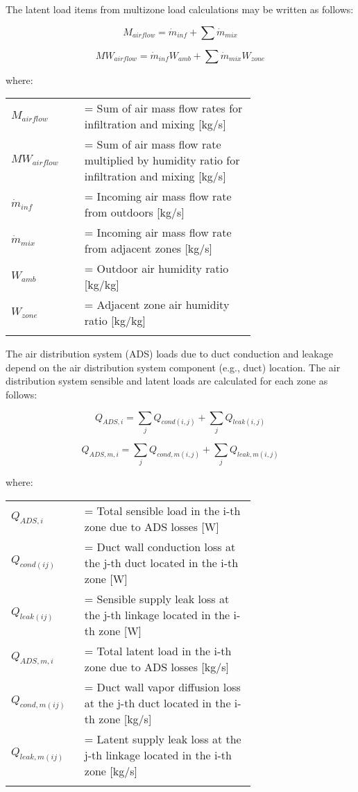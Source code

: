 The latent load items from multizone load calculations may be written as follows:

\begin{equation}
M_{airflow} = \dot{m}_{inf} + \sum \dot{m}_{mix}
\end{equation}

\begin{equation}
MW_{airflow} = \dot{m}_{inf} W_{amb} + \sum \dot{m}_{mix} W_{zone}
\end{equation}

where:

\begin{tabular}{lp{0.7\linewidth}}
\\
$M_{airflow}$ &= Sum of air mass flow rates for infiltration and mixing [kg/s]\\
$MW_{airflow}$ &= Sum of air mass flow rate multiplied by humidity ratio for infiltration and mixing [kg/s]\\
$\dot{m}_{inf}$ &= Incoming air mass flow rate from outdoors [kg/s]\\
$\dot{m}_{mix}$ &= Incoming air mass flow rate from adjacent zones [kg/s]\\
$W_{amb}$ &= Outdoor air humidity ratio [kg/kg]\\
$W_{zone}$ &= Adjacent zone air humidity ratio [kg/kg]\\
\\
\end{tabular}

The air distribution system (ADS) loads due to duct conduction and leakage depend on the air distribution system component (e.g., duct) location. The air distribution system sensible and latent loads are calculated for each zone as follows:

\begin{equation}
Q_{ADS,i} = \sum_{j} Q_{cond(i,j)} + \sum_{j} Q_{leak(i,j)}
\end{equation}

\begin{equation}
Q_{ADS,m,i} = \sum_{j} Q_{cond,m(i,j)} + \sum_{j} Q_{leak,m(i,j)}
\end{equation}

where:

\begin{tabular}{lp{0.7\linewidth}}
\\
$Q_{ADS,i}$ &= Total sensible load in the i-th zone due to ADS losses [W]\\
$Q_{cond(ij)}$ &= Duct wall conduction loss at the j-th duct located in the i-th zone [W]\\
$Q_{leak(ij)}$ &= Sensible supply leak loss at the j-th linkage located in the i-th zone [W]\\
$Q_{ADS,m,i}$ &= Total latent load in the i-th zone due to ADS losses [kg/s]\\
$Q_{cond,m(ij)}$ &= Duct wall vapor diffusion loss at the j-th duct located in the i-th zone [kg/s]\\
$Q_{leak,m(ij)}$ &= Latent supply leak loss at the j-th linkage located in the i-th zone [kg/s]\\
\\
\end{tabular}

